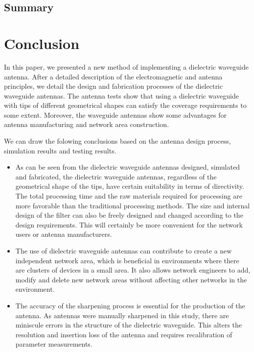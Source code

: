 \documentclass[a4paper,12pt]{report}
\begin{document}
\section{Summary}


\chapter{Conclusion}

In this paper,
we presented a new method of implementing a dielectric waveguide antenna.
After a detailed
description of the electromagnetic and antenna principles,
we detail the design
and fabrication processes of the dielectric waveguide antennas.
The antenna tests show that
using a dielectric waveguide with tips of different geometrical shapes
can satisfy the coverage requirements to some extent.
Moreover,
the waveguide antennas show some advantages for antenna manufacturing and
network area construction.

We can draw the folowing conclusions based on the
antenna design process, simulation results and testing results.

\begin{itemize}
  \item As can be seen from the dielectric waveguide antennas
  designed, simulated and fabricated,
  the dielectric waveguide antennas,
  regardless of the geometrical shape of the tips,
  have certain suitability in terms of directivity.
  The total processing time and
  the raw materials required for processing are more favorable than the
  traditional processing methods.
  The size and internal design of the
  filter can also be freely designed and changed according to the design
  requirements. This will certainly be more convenient for the
  network users or antenna manufacturers.
  \item The use of dielectric waveguide antennas can contribute
  to create a new independent network area,
  which is beneficial in environments where there are
  clusters of devices in a small area.
  It also allows network engineers to
  add, modify and delete new network areas without
  affecting other networks in the environment.
  \item The accuracy of the sharpening process is essential
  for the production of the antenna.
  As antennas were manually sharpened in this study,
  there are miniscule errors in the structure of the dielectric waveguide.
  This alters the resolution and insertion loss of the antenna
  and requires recalibration of parameter measurements.
\end{itemize}
\end{document}
